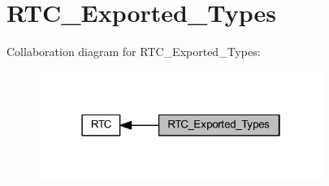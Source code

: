 \hypertarget{group___r_t_c___exported___types}{}\section{R\+T\+C\+\_\+\+Exported\+\_\+\+Types}
\label{group___r_t_c___exported___types}
Collaboration diagram for R\+T\+C\+\_\+\+Exported\+\_\+\+Types\+:
\nopagebreak
\begin{figure}[H]
\begin{center}
\leavevmode
\includegraphics[width=262pt]{group___r_t_c___exported___types}
\end{center}
\end{figure}
